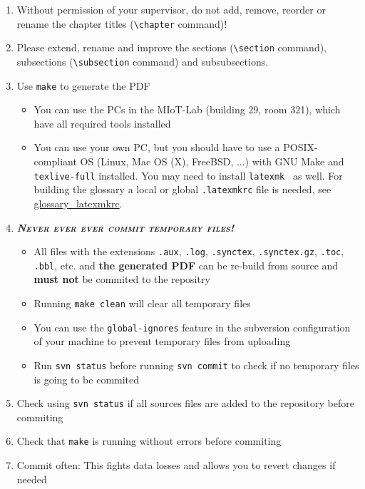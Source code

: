 \begin{enumerate}
	\item Without permission of your supervisor, do not add, remove, reorder or rename the chapter titles (\texttt{\textbackslash{}chapter} command)!
	\item Please extend, rename and improve the sections (\texttt{\textbackslash{}section} command), subsections (\texttt{\textbackslash{}subsection} command) and subsubsections.
	\item Use \texttt{make} to generate the PDF
	\begin{itemize}
		\item You can use the PCs in the MIoT-Lab (building 29, room 321), which have all required tools installed
		\item You can use your own PC, but you should have to use a POSIX-compliant OS (Linux, Mac OS (X), FreeBSD, ...) with GNU Make and \texttt{texlive-full} installed.
		You may need to install \texttt{latexmk}~\cite{latexmk} as well.
		For building the glossary a local or global \texttt{.latexmkrc} file is needed, see \href{https://www.ctan.org/texarchive/support/latexmk/example_rcfiles}{glossary\_latexmkrc}.
	\end{itemize}
	\item \textit{\textbf{\textsc{Never ever ever commit temporary files!}}}
	\begin{itemize}
		\item All files with the extensions \texttt{.aux}, \texttt{.log}, \texttt{.synctex}, \texttt{.synctex.gz}, \texttt{.toc}, \texttt{.bbl}, etc. and \textbf{the generated PDF} can be re-build from source and \textbf{must not} be commited to the repositry
		\item Running \texttt{make clean} will clear all temporary files
		\item You can use the \texttt{global-ignores} feature in the subversion configuration of your machine to prevent temporary files from uploading
		\item Run \texttt{svn status} before running \texttt{svn commit} to check if no temporary files is going to be commited
	\end{itemize}
	\item Check using \texttt{svn status} if all sources files are added to the repository before commiting
	\item Check that \texttt{make} is running without errors before commiting
	\item Commit often: This fights data losses and allows you to revert changes if needed

\end{enumerate}
